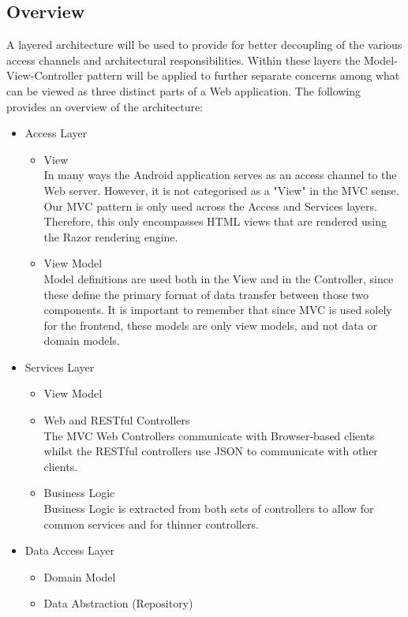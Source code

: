 \documentclass[11pt,a4paper,titlepage]{article}
\begin{document}
	\subsection{Overview}
		A layered architecture will be used to provide for better decoupling of the various		access channels and architectural responsibilities. Within these layers the Model-View-Controller pattern will be applied to further separate concerns among what can be viewed as three distinct parts of a Web application. The following provides an overview of the architecture:
			\begin{itemize}
				\item Access Layer
					\begin{itemize}
						\item View\\
						In many ways the Android application serves as an access channel to the Web server. However, it is not categorised as a "View" in the MVC sense. Our MVC pattern is only used across the Access and Services layers. Therefore, this only encompasses HTML views that are rendered using the Razor rendering engine.
						\item View Model\\
						Model definitions are used both in the View and in the Controller, since these define the primary format of data transfer between those two components. It is important to remember that since MVC is used solely for the frontend, these models are only view models, and not data or domain models.
					\end{itemize}
				\item Services Layer
				    \begin{itemize}
						\item View Model
						\item Web and RESTful Controllers\\
						The MVC Web Controllers communicate with Browser-based clients whilst the RESTful controllers use JSON to communicate with other clients.
						\item Business Logic\\
						Business Logic is extracted from both sets of controllers to allow for common services and for thinner controllers.
					\end{itemize}
				\item Data Access Layer
				    \begin{itemize}
						\item Domain Model						
						\item Data Abstraction (Repository)\\

\end{itemize}
\end{itemize}
\end{document}
